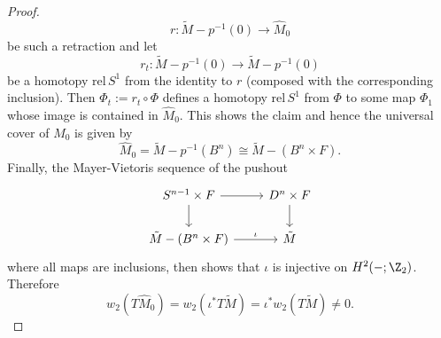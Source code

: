 \begin{proof}
    \[
    r \colon \tilde{M} - p^{-1}(0) \to \hat{M}_0
    \]
    be such a retraction and let 
    \[
    r_t \colon \tilde{M} - p^{-1}(0) \to \tilde{M} - p^{-1}(0)
    \]
    be a homotopy rel$\,S^1$ from the identity to $r$ (composed with the corresponding inclusion). Then $\Phi_t := r_t \circ \Phi$ defines a homotopy rel$\,S^1$ from $\Phi$ to some map $\Phi_1$ whose image is contained in $\hat{M}_0$. 
    This shows the claim and hence the universal cover of $M_0$ is given by 
    \[
    \hat{M}_0 = \tilde{M} - p^{-1}(B^n) \cong \tilde{M} - (B^n \times F).
    \]
    Finally, the Mayer-Vietoris sequence of the pushout 
    \[\begin{tikzcd}
	{S^{n-1} \times F} & {D^n \times F} \\
	{\tilde{M} - (B^n \times F)} & {\tilde{M}}
	\arrow[from=1-1, to=1-2]
	\arrow[from=1-1, to=2-1]
	\arrow[from=1-2, to=2-2]
	\arrow["\iota", from=2-1, to=2-2]
    \end{tikzcd}\]
    where all maps are inclusions, then shows that $\iota$ is injective on $H^2(-;\Z_2)$. Therefore
    \[
    w_2(T\hat{M}_0) = w_2(\iota^\ast T\tilde{M}) = \iota^\ast w_2(T\tilde{M}) \neq 0.
    \]
\end{proof}



